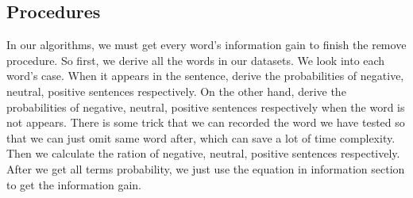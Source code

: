 \documentclass{article}
\begin{document}
  \subsection{Procedures}
  In our algorithms, we must get every word's information gain to finish the remove procedure. So first, we derive all the words in our datasets. We look into each word's case. When it appears in the sentence, derive the probabilities of negative, neutral, positive sentences respectively. On the other hand, derive the probabilities of negative, neutral, positive sentences respectively when the word is not appears. There is some trick that we can recorded the word we have tested so that we can just omit same word after, which can save a lot of time complexity. Then we calculate the ration of negative, neutral, positive sentences respectively. After we get all terms probability, we just use the equation in information section to get the information gain.
\end{document}
